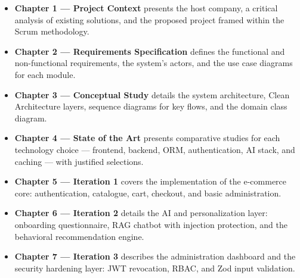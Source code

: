 \begin{itemize}
  \item \textbf{Chapter 1 --- Project Context} presents the host company,
        a critical analysis of existing solutions, and the proposed project
        framed within the Scrum methodology.

  \item \textbf{Chapter 2 --- Requirements Specification} defines the
        functional and non-functional requirements, the system's actors,
        and the use case diagrams for each module.

  \item \textbf{Chapter 3 --- Conceptual Study} details the system architecture,
        Clean Architecture layers, sequence diagrams for key flows, and the
        domain class diagram.

  \item \textbf{Chapter 4 --- State of the Art} presents comparative studies
        for each technology choice --- frontend, backend, ORM, authentication,
        AI stack, and caching --- with justified selections.

  \item \textbf{Chapter 5 --- Iteration 1} covers the implementation of the
        e-commerce core: authentication, catalogue, cart, checkout, and
        basic administration.

  \item \textbf{Chapter 6 --- Iteration 2} details the AI and personalization
        layer: onboarding questionnaire, RAG chatbot with injection protection,
        and the behavioral recommendation engine.

  \item \textbf{Chapter 7 --- Iteration 3} describes the administration dashboard
        and the security hardening layer: JWT revocation, RBAC, and Zod
        input validation.
\end{itemize}
